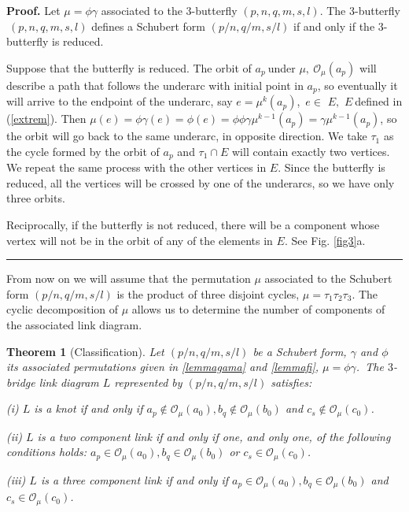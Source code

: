 \documentclass[12pt]{article}%
\newtheorem{theorem}{Theorem}
\newenvironment{proof}[1][Proof]{\noindent\textbf{#1.} }{\ \rule{0.5em}{0.5em}}
\begin{document}
\begin{proof}
Let $\mu=\phi\gamma$ associated to the 3-butterfly $\left(
p,n,q,m,s,l\right)  $. The 3-butterfly$\ \left(  p,n,q,m,s,l\right)  $ defines
a Schubert form $\left(  p/n,q/m,s/l\right)  $ if and only if the 3-butterfly
is reduced.

Suppose that the butterfly is reduced. The orbit of $a_{p}\ $under
$\mu,\ \mathcal{O}_{\mu}\left(  a_{p}\right)  $ will describe a path that
follows the underarc with initial point in $a_{p}$, so eventually it will
arrive to the endpoint of the underarc, say $e=\mu^{k}\left(  a_{p}\right)
$,\ $e\in$ $E,$ $E\ $defined in (\ref{extrem}). Then $\mu\left(  e\right)
=\phi\gamma\left(  e\right)  =\phi\left(  e\right)  =\phi\phi\gamma\mu
^{k-1}\left(  a_{p}\right)  =\gamma\mu^{k-1}\left(  a_{p}\right)  $, so the
orbit will go back to the same underarc, in opposite direction. We take
$\tau_{1}$ as the cycle formed by the orbit of $a_{p}$ and $\tau_{1}\cap E$
will contain exactly two vertices. We repeat the same process with the other
vertices in $E$. Since the butterfly is reduced, all the vertices will be
crossed by one of the underarcs, so we have only three orbits.

Reciprocally, if the butterfly is not reduced, there will be a component whose
vertex will not be in the orbit of any of the elements in $E$. See Fig.
\ref{fig3}a.
\end{proof}

From now on we will assume that the permutation $\mu$ associated to the
Schubert form $\left(  p/n,q/m,s/l\right)  $ is the product of three disjoint
cycles, $\mu=\tau_{1}\tau_{2}\tau_{3}$. The cyclic decomposition of $\mu$
allows us to determine the number of components of the associated link diagram.

\begin{theorem}
[Classification]\label{teoclaslink}Let $\left(  p/n,q/m,s/l\right)  $ be a
Schubert form, $\gamma$ and $\phi$ its associated permutations given in
\ref{lemmagama} and \ref{lemmafi}, $\mu=\phi\gamma$.\ The $3$-bridge link
diagram $L$ represented by $\left(  p/n,q/m,s/l\right)  $ satisfies:

(i) $L$ is a knot if and only if $a_{p}\notin\mathcal{O}_{\mu}\left(
a_{0}\right)  ,b_{q}\notin\mathcal{O}_{\mu}\left(  b_{0}\right)  $ and
$c_{s}\notin\mathcal{O}_{\mu}\left(  c_{0}\right)  $.

(ii) $L$ is a two component link if and only if one, and only one, of the
following conditions holds: $a_{p}\in\mathcal{O}_{\mu}\left(  a_{0}\right)
,b_{q}\in\mathcal{O}_{\mu}\left(  b_{0}\right)  $ or $c_{s}\in\mathcal{O}%
_{\mu}\left(  c_{0}\right)  $.

(iii) $L$ is a three component link if and only if $a_{p}\in\mathcal{O}_{\mu
}\left(  a_{0}\right)  ,b_{q}\in\mathcal{O}_{\mu}\left(  b_{0}\right)  $ and
$c_{s}\in\mathcal{O}_{\mu}\left(  c_{0}\right)  $.
\end{theorem}
\end{document}
